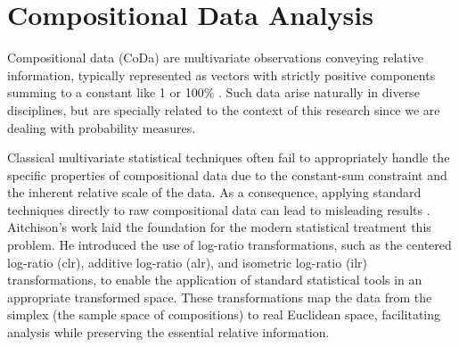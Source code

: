 \documentclass[
	12pt,				%
	oneside,			%
	a4paper,			%
	english,			%
	brazil				%
	]{abntex2ppgsi}
\begin{document}




\section{Compositional Data Analysis}
\label{subsec:CoDa}
Compositional data (CoDa) are multivariate observations conveying relative information, typically represented as vectors with strictly positive components summing to a constant like 1 or 100\% \cite{aitchison1982statistical}. Such data arise naturally in diverse disciplines, but are specially related to the context of this research since we are dealing with probability measures.

Classical multivariate statistical techniques often fail to appropriately handle the specific properties of compositional data due to the constant-sum constraint and the inherent relative scale of the data. As a consequence, applying standard techniques directly to raw compositional data can lead to misleading results \cite{pawlowsky2015modelling}. Aitchison's work \cite{aitchison1986statistical} laid the foundation for the modern statistical treatment this problem. He introduced the use of log-ratio transformations, such as the centered log-ratio (clr), additive log-ratio (alr), and isometric log-ratio (ilr) transformations, to enable the application of standard statistical tools in an appropriate transformed space. These transformations map the data from the simplex (the sample space of compositions) to real Euclidean space, facilitating analysis while preserving the essential relative information.
\end{document}
